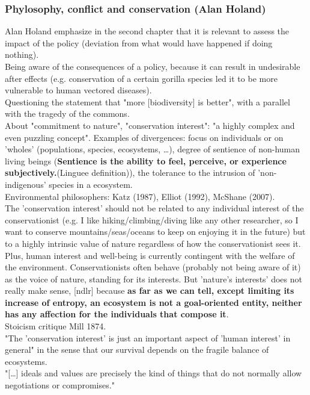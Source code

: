 \documentclass[12pt]{article}
\begin{document}
\subsubsection{Phylosophy, conflict and conservation (Alan Holand)}
Alan Holand emphasize in the second chapter that it is relevant to assess the impact of the policy (deviation from what would have happened if doing nothing).\\
Being aware of the consequences of a policy, because it can result in undesirable after effects (e.g. conservation of a certain gorilla species led it to be more vulnerable to human vectored diseases).\\
Questioning the statement that "more [biodiversity] is better", with a parallel with the tragedy of the commons.\\
About "commitment to nature", "conservation interest": "a highly complex and even puzzling concept". Examples of divergences: focus on individuals or on 'wholes' (populations, species, ecosystems, \dots), degree of sentience of non-human living beings (\textbf{Sentience is the ability to feel, perceive, or experience subjectively.}(Linguee definition)), the tolerance to the intrusion of 'non-indigenous' species in a ecosystem.\\
Environmental philosophers: Katz (1987), Elliot (1992), McShane (2007).\\
The 'conservation interest' should not be related to any individual interest of the conservationist (e.g. I like hiking/climbing/diving like any other researcher, so I want to conserve mountains/seas/oceans to keep on enjoying it in the future) but to a highly intrinsic value of nature regardless of how the conservationist sees it.
Plus, human interest and well-being is currently contingent with the welfare of the environment.
Conservationists often behave (probably not being aware of it) as the voice of nature, standing for its interests. But 'nature's interests' does not really make sense, [ndlr] because \textbf{as far as we can tell, except limiting its increase of entropy, an ecosystem is not a goal-oriented entity, neither has any affection for the individuals that compose it}.\\
Stoicism critique Mill 1874.\\
"The 'conservation interest' is just an important aspect of 'human interest' in general" in the sense that our survival depends on the fragile balance of ecosystems.\\
"[\dots] ideals and values are precisely the kind of things that do not normally allow negotiations or compromises."
\end{document}
